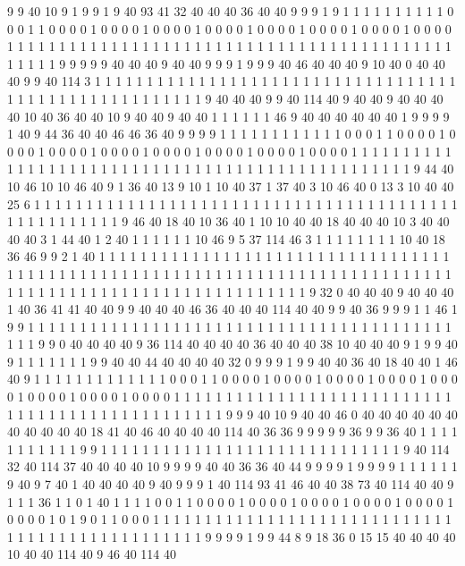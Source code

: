 9 9 40 10 9 1 9 9 1 9 40 93 41 32 40 40 40 36 40 40
9 9 9 1 9 1 1 1 1 1 1 1 1 1 1 0 0 0 1 1
0 0 0 0 1 0 0 0 0 1 0 0 0 0 1 0 0 0 0 1
0 0 0 0 1 0 0 0 0 1 0 0 0 0 1 0 0 0 0 1
1 1 1 1 1 1 1 1 1 1 1 1 1 1 1 1 1 1 1 1
1 1 1 1 1 1 1 1 1 1 1 1 1 1 1 1 1 1 1 1
1 1 1 1 1 1 1 9 9 9 9 9 40 40 40 9 40 40 9 9
9 1 9 9 9 40 46 40 40 40 9 10 40 0 40 40 40 9 9 40
114 3 1 1 1 1 1 1 1 1 1 1 1 1 1 1 1 1 1 1
1 1 1 1 1 1 1 1 1 1 1 1 1 1 1 1 1 1 1 1
1 1 1 1 1 1 1 1 1 1 1 1 1 1 1 1 9 40 40 40
9 9 40 114 40 9 40 40 9 40 40 40 40 10 40 36 40 40 10 9
40 40 9 40 40 1 1 1 1 1 1 46 9 40 40 40 40 40 40 1
9 9 9 9 1 40 9 44 36 40 40 46 46 36 40 9 9 9 9 1
1 1 1 1 1 1 1 1 1 1 1 0 0 0 1 1 0 0 0 0
1 0 0 0 0 1 0 0 0 0 1 0 0 0 0 1 0 0 0 0
1 0 0 0 0 1 0 0 0 0 1 0 0 0 0 1 1 1 1 1
1 1 1 1 1 1 1 1 1 1 1 1 1 1 1 1 1 1 1 1
1 1 1 1 1 1 1 1 1 1 1 1 1 1 1 1 1 1 1 1
1 1 1 1 9 44 40 10 46 10 10 46 40 9 1 36 40 13 9 10
1 10 40 37 1 37 40 3 10 46 40 0 13 3 10 40 40 25 6 1
1 1 1 1 1 1 1 1 1 1 1 1 1 1 1 1 1 1 1 1
1 1 1 1 1 1 1 1 1 1 1 1 1 1 1 1 1 1 1 1
1 1 1 1 1 1 1 1 1 1 1 9 46 40 18 40 10 36 40 1
10 10 40 40 18 40 40 40 10 3 40 40 40 40 3 1 44 40 1 2
40 1 1 1 1 1 1 10 46 9 5 37 114 46 3 1 1 1 1 1
1 1 1 10 40 18 36 46 9 9 2 1 40 1 1 1 1 1 1 1
1 1 1 1 1 1 1 1 1 1 1 1 1 1 1 1 1 1 1 1
1 1 1 1 1 1 1 1 1 1 1 1 1 1 1 1 1 1 1 1
1 1 1 1 1 1 1 1 1 1 1 1 1 1 1 1 1 1 1 1
1 1 1 1 1 1 1 1 1 1 1 1 1 1 1 1 1 1 1 1
1 1 1 1 1 1 1 1 1 1 1 1 1 1 1 1 1 1 1 9
32 0 40 40 40 9 40 40 40 1 40 36 41 41 40 40 9 9 40 40
40 46 36 40 40 40 114 40 40 9 9 40 36 9 9 9 1 1 46 1
9 9 1 1 1 1 1 1 1 1 1 1 1 1 1 1 1 1 1 1
1 1 1 1 1 1 1 1 1 1 1 1 1 1 1 1 1 1 1 1
1 1 1 1 1 1 9 9 0 40 40 40 40 9 36 114 40 40 40 40
36 40 40 40 38 10 40 40 40 9 1 9 9 40 9 1 1 1 1 1
1 1 9 9 40 40 44 40 40 40 40 32 0 9 9 9 1 9 9 40
40 36 40 18 40 40 1 46 40 9 1 1 1 1 1 1 1 1 1 1
1 1 1 0 0 0 1 1 0 0 0 0 1 0 0 0 0 1 0 0
0 0 1 0 0 0 0 1 0 0 0 0 1 0 0 0 0 1 0 0
0 0 1 0 0 0 0 1 1 1 1 1 1 1 1 1 1 1 1 1
1 1 1 1 1 1 1 1 1 1 1 1 1 1 1 1 1 1 1 1
1 1 1 1 1 1 1 1 1 1 1 1 1 1 1 9 9 9 40 10
9 40 40 46 0 40 40 40 40 40 40 40 40 40 40 40 18 41 40 46
40 40 40 40 114 40 36 36 9 9 9 9 9 36 9 9 36 40 1 1
1 1 1 1 1 1 1 1 1 9 9 1 1 1 1 1 1 1 1 1
1 1 1 1 1 1 1 1 1 1 1 1 1 1 1 1 1 1 1 1
9 40 114 32 40 114 37 40 40 40 40 10 9 9 9 9 40 40 36 36
40 44 9 9 9 9 1 9 9 9 9 1 1 1 1 1 1 9 40 9
7 40 1 40 40 40 40 9 40 9 9 9 1 40 114 93 41 46 40 40
38 73 40 114 40 40 9 1 1 1 36 1 1 0 1 40 1 1 1 1
0 0 1 1 0 0 0 0 1 0 0 0 0 1 0 0 0 0 1 0
0 0 0 1 0 0 0 0 1 0 0 0 0 1 0 1 9 0 1 1
0 0 0 1 1 1 1 1 1 1 1 1 1 1 1 1 1 1 1 1
1 1 1 1 1 1 1 1 1 1 1 1 1 1 1 1 1 1 1 1
1 1 1 1 1 1 1 1 1 1 1 9 9 9 9 1 9 9 44 8
9 18 36 0 15 15 40 40 40 40 10 40 40 114 40 9 46 40 114 40
